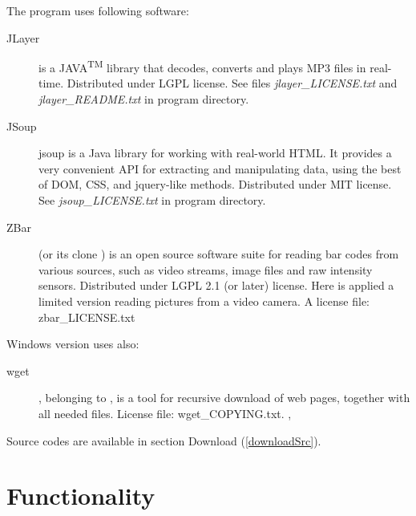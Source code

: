 \documentclass[polish,a4paper,11pt,oneside]{article}
\begin{document}
The program uses following software:

\begin{description}
\item[JLayer]
  is a JAVA\textsuperscript{TM} library that decodes, converts and plays MP3 files in real-time.
  Distributed under LGPL license.
  See files {\em jlayer\_LICENSE.txt} and {\em jlayer\_README.txt} in program directory.

\item[JSoup]
  jsoup is a Java library for working with real-world HTML.
  It provides a very convenient API for extracting and manipulating data,
  using the best of DOM, CSS, and jquery-like methods.
  Distributed under MIT license.
  See {\em jsoup\_LICENSE.txt} in program directory.

\item[ZBar]
  (or its clone 
  )
  is an open source software suite for reading bar codes from various sources,
  such as video streams, image files and raw intensity sensors.
  Distributed under LGPL 2.1 (or later) license.
  Here is applied a limited version reading pictures from a video camera.
  A license file: zbar\_LICENSE.txt

\end{description}

Windows version uses also:
  
\begin{description}

\item[wget]
  ,
  belonging to ,
  is a tool for recursive download of web pages, together with all needed files.
  License file: wget\_COPYING.txt.
  ,
  
\end{description}

Source codes are available in section Download (\ref{downloadSrc}).

\section{Functionality}
\end{document}
